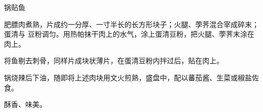 \begin{recipe}{锅贴鱼}

\ingredients


\preparation

肥膘肉煮熟，片成约一分厚、一寸半长的长方形块子；火腿、荸荠混合宰成碎末；蛋清与
豆粉调匀。用热帕抹干肉上的水气，涂上蛋清豆粉，把火腿、荸荠末涂在肉上。

将鱼剔去刺骨，同样片成块状薄片，在蛋清豆粉内拌过后，贴在肉上。

锅烧辣后下油，随即将上述肉块用文火煎熟，盛盘中，配以蕃茄酱、生菜或椒盐佐食。

\features

酥香、味美。

\end{recipe}

